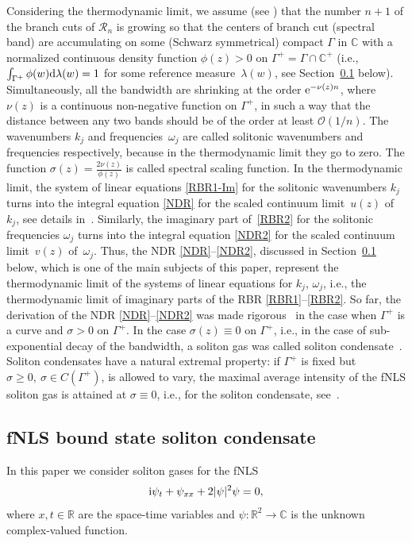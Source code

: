 \documentclass[pdftex]{sigma}
\numberwithin{equation}{section}
\def\ra{\rightarrow}
\newcommand{\G}{\Gamma}
\renewcommand{\o}{\omega}
\def\Rscr{\mathcal{R}}
\def\C{{\mathbb C}}
\def\R{{\mathbb R}}
\def\l{\lambda}
\def\s{ {\sigma}}
\def\l{\lambda}
\def\s{\sigma}
\def\o{\omega}
\def\G{\Gamma}
\begin{document}
Considering the thermodynamic limit, we assume
(see \cite{ElRew1,ET2020}) that the number $n+1$ of the branch cuts of $\Rscr_n$ is growing so that the centers of branch cut (spectral band) are accumulating on some (Schwarz symmetrical) compact $\G$ in $\C$ with a
normalized continuous density function $\phi(z)>0$ on $\G^+=\G\cap\C^+$ \big(i.e., $\int_{\G^+}\phi(w){\rm d}\l(w)=1$ for some reference measure~$\l(w)$, see Section~\ref{sec-KdV} below\big).
Simultaneously, all the bandwidth are shrinking at the order ${\rm e}^{-\nu(z)n}$, where~$\nu(z)$ is a continuous non-negative function on $\G^+$,
in such a way that the distance between any two bands should be of the order at least $\mathcal{O}(1/n)$. The wavenumbers $k_j$ and frequencies~$\o_j$ are called solitonic wavenumbers and frequencies respectively, because in the thermodynamic limit they go to zero. The function $\s(z)=\frac{ 2\nu(z)}{\phi(z)}$ is called spectral scaling function.
	In
	the thermodynamic limit, the system of linear equations \eqref{RBR1-Im} for the solitonic wavenumbers $k_j$ turns into the integral equation \eqref{NDR} for the scaled continuum limit~$u(z)$ of~$k_j$, see details in~\cite{ET2020}.
	Similarly, the imaginary part of~\eqref{RBR2} for the solitonic frequencies $\o_j$ turns into the integral equation \eqref{NDR2} for the scaled continuum limit~$v(z)$ of~$\o_j$.
	Thus, the NDR
	\eqref{NDR}--\eqref{NDR2}, discussed in Section~\ref{sec-KdV} below, which is one of the main subjects of this paper, represent the thermodynamic limit of the systems of linear equations for $k_j$, $\o_j$, i.e., the thermodynamic limit of imaginary parts of the RBR \eqref{RBR1}--\eqref{RBR2}.
So far, the derivation of the NDR
\eqref{NDR}--\eqref{NDR2} was made rigorous~\cite{TW}
in the case when $\G^+$ is a curve and $\s>0$ on $\G^+$. In the case $\s(z)\equiv 0$ on $\G^+$, i.e., in the case of sub-exponential decay of the bandwidth, a soliton gas was called soliton condensate~\cite{ET2020}. Soliton condensates have a natural extremal property: if $\G^+$ is fixed but $\s\geq 0,~\s\in C(\G^+)$, is allowed to vary, the maximal average intensity of the fNLS soliton gas is attained at $\s\equiv 0$, i.e., for the soliton condensate, see~\cite{KT2021}.

\subsection{fNLS bound state soliton condensate}\label{sec-KdV}

In this paper we consider soliton gases for the fNLS
\begin{equation*} %
{\rm i} \psi_t + \psi_{xx} +2 |\psi|^2 \psi=0,
\end{equation*}
where $x,t\in \R$ are the space-time variables and $\psi\colon \R^2 \ra \C$ is the unknown complex-valued function.
\end{document}
